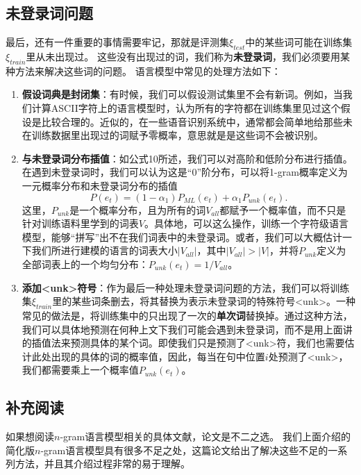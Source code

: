 \documentclass[10pt,a4paper]{ctexart}
\begin{document}
\subsection{未登录词问题}
最后，还有一件重要的事情需要牢记，那就是评测集$\xi_{test}$中的某些词可能在训练集$\xi_{train}$里从未出现过。
这些没有出现过的词，我们称为\textbf{未登录词}，我们必须要用某种方法来解决这些词的问题。
语言模型中常见的处理方法如下：
\begin{enumerate}
\item[] \textbf{假设词典是封闭集}：有时候，我们可以假设测试集里不会有新词。例如，当我们计算ASCII字符上的语言模型时，认为所有的字符都在训练集里见过这个假设是比较合理的。近似的，在一些语音识别系统中，通常都会简单地给那些未在训练数据里出现过的词赋予零概率，意思就是是这些词不会被识别。
\item[] \textbf{与未登录词分布插值}：如公式10所述，我们可以对高阶和低阶分布进行插值。在遇到未登录词时，我们可以认为这是“0”阶分布，可以将1-gram概率定义为一元概率分布和未登录词分布的插值\[ P(e_t) = (1 - \alpha_1)P_{ML}(e_t) + \alpha_1 P_{unk}(e_t).\]这里，$P_{unk}$是一个概率分布，且为所有的词$V_{all}$都赋予一个概率值，而不只是针对训练语料里学到的词表$V$。具体地，可以这么操作，训练一个字符级语言模型，能够“拼写”出不在我们词表中的未登录词。或者，我们可以大概估计一下我们所进行建模的语言的词表大小$|V_{all}|$，其中$|V_{all}| > |V|$，并将$P_{unk}$定义为全部词表上的一个均匀分布：$P_{unk}(e_t) = 1 / {V_{all}}$。
\item[] \textbf{添加<unk>符号}：作为最后一种处理未登录词问题的方法，我们可以将训练集$\xi_{train}$里的某些词条删去，将其替换为表示未登录词的特殊符号<unk>。一种常见的做法是，将训练集中的只出现了一次的\textbf{单次词}替换掉。通过这种方法，我们可以具体地预测在何种上文下我们可能会遇到未登录词，而不是用上面讲的插值法来预测具体的某个词。即使我们只是预测了<unk>符，我们也需要估计此处出现的具体的词的概率值，因此，每当在句中位置$i$处预测了<unk>，我们都需要乘上一个概率值$P_{unk}(e_t)$。
\end{enumerate}

\subsection{补充阅读}
如果想阅读$n$-gram语言模型相关的具体文献，论文\cite{goodman2001bit}是不二之选。
我们上面介绍的简化版$n$-gram语言模型具有很多不足之处，这篇论文给出了解决这些不足的一系列方法，并且其介绍过程非常的易于理解。
\end{document}
